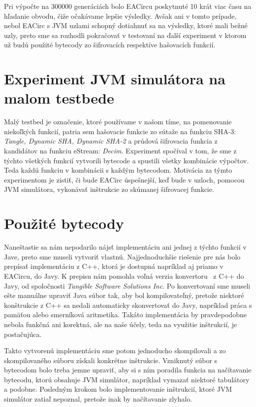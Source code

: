 Pri výpočte na 300000 generáciách bolo EACircu poskytnuté 10 krát viac času na hľadanie obvodu, čiže očakávame lepšie výsledky. Avšak ani v tomto prípade, nebol EACirc s JVM uzlami schopný dotiahnuť sa na výsledky, ktoré mali bežné uzly, preto sme sa rozhodli pokračovať v testovaní na ďalší experiment v ktorom už budú použité bytecody zo šifrovacích respektíve hašovacích funkcií.

\section{Experiment JVM simulátora na malom testbede}
\label{sec:exp2}

Malý testbed je označenie, ktoré používame v našom tíme, na pomenovanie niekoľkých funkcií, patria sem hašovacie funkcie zo sútaže na funkciu SHA-3: \textit{Tangle, Dynamic SHA, Dynamic SHA-2} a prúdová šifrovacia funkcia z kandidátov na funkciu eStream: \textit{Decim}. Experiment spočíval v tom, že sme z týchto všetkých funkcií vytvorili bytecode a spustili všetky kombinácie výpočtov. Teda každú funkciu v kombinácii s každým bytecodom. Motivácia za týmto experimentom je zistiť, či bude EACirc úspešnejší, keď bude v uzloch, pomocou JVM simulátora, vykonávať inštrukcie zo skúmanej šifrovacej funkcie. 

\section{Použité bytecody}
\label{sec:exp2-bytecode}

Naneštastie sa nám nepodarilo nájsť implementáciu ani jednej z týchto funkcií v Jave, preto sme museli vytvoriť vlastnú. Najjednoduchšie riešenie pre nás bolo prepísať implementáciu z C++, ktorá je dostupná napríklad aj priamo v EACircu, do Javy. K prepisu nám pomohla voľná verzia konvertoru~\parencite{c++-java-converter} z C++ do Javy, od spoločnosti \textit{Tangible Software Solutions Inc}. Po konvertovaní sme museli ešte manuálne upraviť Java súbor tak, aby bol kompilovateľný, pretože niektoré konštrukcie z C++ sa nedali automaticky skonvertovať do Javy, napríklad práca s pamäťou alebo smerníková aritmetika. Takáto implementácia by pravdepodobne nebola funkčná ani korektná, ale na naše účely, teda na využitie inštrukcií, je postačujúca. 

Takto vytvorenú implementáciu sme potom jednoducho skompilovali a zo skompilovaného súboru získali konkrétne inštrukcie. Vzniknutý súbor s bytecodom bolo treba jemne upraviť, aby si s ním poradila funkcia na načítavanie bytecodu, ktorú obsahuje JVM simulátor, napríklad vymazať niektoré tabulátory a podobne. Posledným krokom bolo implementovanie inštrukcií, ktoré JVM simulátor zatiaľ nepoznal, pretože inak by načítavanie zlyhalo.

